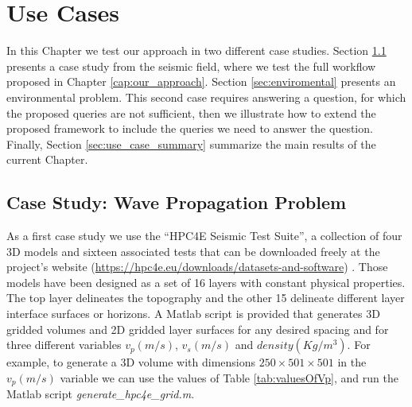 \chapter[Use Cases]{Use Cases}\label{cap:use_cases}
In this Chapter we test our approach in two different case studies. Section \ref{sec:seismic} presents a case study from the seismic field, where we test the full workflow proposed in Chapter \ref{cap:our_approach}. Section \ref{sec:enviromental} presents an environmental problem. This second case requires answering a question, for which the proposed queries are not sufficient, then we illustrate how to extend the proposed framework to include the queries we need to answer the question. Finally, Section \ref{sec:use_case_summary} summarize the main results of the current Chapter.

\section{Case Study:  Wave Propagation Problem}\label{sec:seismic}
As a first case study we use the “HPC4E Seismic Test Suite”, a collection of four 3D models and sixteen associated tests that can be downloaded freely at the project's website (\url{https://hpc4e.eu/downloads/datasets-and-software}) \cite{deLaPuente2015}. Those models have been designed as a set of 16 layers with constant physical properties. The top layer delineates the topography and the other 15 delineate different layer interface surfaces or horizons. A Matlab script is provided that generates 3D gridded volumes and 2D gridded layer surfaces for any desired spacing and for three different variables $v_{p}(m/s)$, $v_{s}(m/s)$ and $density(Kg/m^3)$. For example, to generate a 3D volume with dimensions $250\times501\times501$ in the $v_{p}(m/s)$ variable we can use the values of Table \ref{tab:valuesOfVp}, and run the Matlab script \textit{generate\_hpc4e\_grid.m}.

